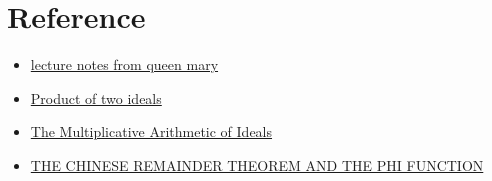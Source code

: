 \section{Reference}
\begin{itemize}
    \item \href{https://webspace.maths.qmul.ac.uk/r.a.bailey/MAS305/algnotes14.pdf}{lecture notes from queen mary}
    \item \href{https://www.youtube.com/watch?v=_1Ts5TcHyQ4}{Product of two ideals}
    \item \href{http://ramanujan.math.trinity.edu/rdaileda/teach/f19/m4363/arith2.pdf}{The Multiplicative Arithmetic of Ideals}
    \item \href{https://public.csusm.edu/aitken_html/m422/Handout6.pdf}{THE CHINESE REMAINDER THEOREM AND THE PHI FUNCTION}
\end{itemize}
